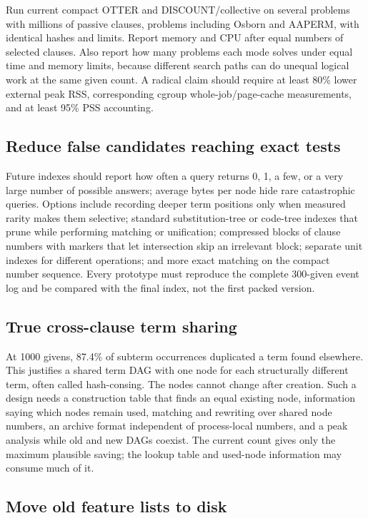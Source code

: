 \documentclass[11pt]{article}
\begin{document}
Run current compact OTTER and DISCOUNT/collective on several problems with
millions of passive clauses,
problems including Osborn and AAPERM, with identical hashes and limits.  Report
memory and CPU after equal numbers of selected clauses.  Also report how many
problems each mode solves under equal time and memory limits, because different
search paths can do unequal logical work at the same given count.  A radical
claim should require at least 80\% lower external peak RSS,
corresponding cgroup whole-job/page-cache measurements, and at least 95\% PSS
accounting.

\subsection{Reduce false candidates reaching exact tests}

Future indexes should report how often a query returns 0, 1, a few, or a very
large number of possible answers; average bytes per node hide rare catastrophic
queries.  Options include recording deeper term positions only when measured
rarity makes them selective; standard substitution-tree or code-tree indexes
that prune while performing matching or unification; compressed blocks of
clause numbers with markers that let intersection skip an irrelevant block;
separate unit indexes for different operations; and more exact matching on the
compact number sequence.  Every prototype must reproduce the complete
300-given event log and be compared with the final index, not the first packed
version.

\subsection{True cross-clause term sharing}

At 1000 givens, 87.4\% of subterm occurrences duplicated a term found elsewhere.
This justifies a shared term DAG with one node for each structurally different
term, often called hash-consing.  The nodes cannot change after creation.  Such
a design needs a construction table that finds an equal existing node,
information saying which nodes remain
used, matching and rewriting over shared node numbers, an archive format
independent of process-local numbers, and a peak analysis while old and new
DAGs coexist.  The current count gives only the maximum plausible saving; the
lookup table and used-node information may consume much of it.

\subsection{Move old feature lists to disk}
\end{document}

